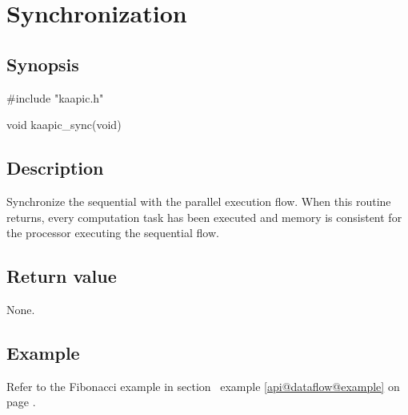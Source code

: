 \documentclass[a4paper, 11pt]{article}
\makeatletter
\newcommand{\apirefp}[2][\@empty]{%
  \def\api@part{#1}%
  \def\api@partref{\@empty}%
  \ifx\api@part\api@partref%
    \def\api@lab{api@#2}%
  \else%
    \def\api@lab{api@#2@#1}%
  \fi%
  \expandafter\ref\expandafter{\api@lab} on page \pageref{\api@lab}%
}
\newenvironment{apisection}[2][noshortnameprovided]{%
  \newpage
  \section{#2}
  \label{api@#1}
  \newcommand{\api@newpart}[4][noshortpartnameprovided]{%
    \newenvironment{##1}{%
      \subsection{##2}%
      \label{api@#1@##1}%
      ##3%
    }{##4}%
  }%
  \api@newpart[synopsis]{Synopsis}{}{}%
  \api@newpart[desc]{Description}{}{}%
  \api@newpart[params]{Parameters}{%
    \let\api@indesc\@empty
    \newcommand{\param}[1]{%
      \def\api@indesc{yes}%
      \begin{description}%
        \renewcommand{\param}[1]{\item[########1]}%
      \item[####1]
      }%
      \newenvironment{parameters}{%
        \begin{description}%
          \renewcommand{\param}[1]{\item[########1]}%
        }{%
        \end{description}%
      }
    }{%
      \ifx\api@indesc\@empty\relax\else%
    \end{description}%
    \fi%
  }%
  \api@newpart[ret]{Return value}{%
    \newcommand{\otherret}{\par\medskip\noindent}%
  }{}%
  \api@newpart[example]{Example}{}{}%
}{}
\makeatother
\begin{document}
\begin{apisection}[sync]{Synchronization}

  \begin{synopsis}
    \begin{code}
#include "kaapic.h"

void kaapic_sync(void)
    \end{code}
  \end{synopsis}

  \begin{desc}
    Synchronize the sequential with the parallel execution flow. When
    this routine returns, every computation task has been executed and
    memory is consistent for the processor executing the sequential
    flow.
  \end{desc}
  \begin{ret}
    None.
  \end{ret}
  \begin{example}
    Refer to the Fibonacci example in section~\apirefp[example]{dataflow}.
  \end{example}
\end{apisection}
\end{document}

